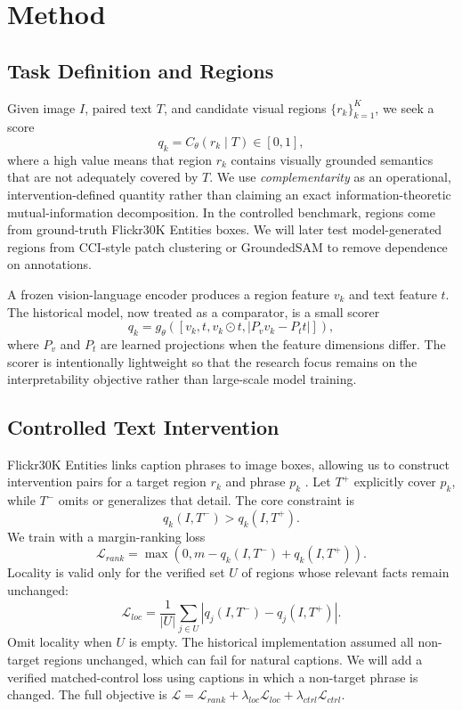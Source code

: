 \documentclass[10pt,twocolumn]{article}
\begin{document}
\section{Method}
\subsection{Task Definition and Regions}
Given image $I$, paired text $T$, and candidate visual regions $\{r_k\}_{k=1}^{K}$, we seek a score
\begin{equation}
q_k = C_\theta(r_k\mid T) \in [0,1],
\end{equation}
where a high value means that region $r_k$ contains visually grounded semantics that are not adequately covered by $T$. We use \emph{complementarity} as an operational, intervention-defined quantity rather than claiming an exact information-theoretic mutual-information decomposition. In the controlled benchmark, regions come from ground-truth Flickr30K Entities boxes. We will later test model-generated regions from CCI-style patch clustering or GroundedSAM to remove dependence on annotations.

A frozen vision-language encoder produces a region feature $v_k$ and text feature $t$. The historical model, now treated as a comparator, is a small scorer
\begin{equation}
q_k = g_\theta([v_k,t,v_k\odot t,|P_vv_k-P_tt|]),
\end{equation}
where $P_v$ and $P_t$ are learned projections when the feature dimensions differ. The scorer is intentionally lightweight so that the research focus remains on the interpretability objective rather than large-scale model training.

\subsection{Controlled Text Intervention}
Flickr30K Entities links caption phrases to image boxes, allowing us to construct intervention pairs for a target region $r_k$ and phrase $p_k$ \cite{plummer2017}. Let $T^{+}$ explicitly cover $p_k$, while $T^{-}$ omits or generalizes that detail. The core constraint is
\begin{equation}
q_k(I,T^{-}) > q_k(I,T^{+}).
\end{equation}
We train with a margin-ranking loss
\begin{equation}
\mathcal L_{rank}=\max(0,m-q_k(I,T^{-})+q_k(I,T^{+})).
\end{equation}
Locality is valid only for the verified set $U$ of regions whose relevant facts remain unchanged:
\begin{equation}
\mathcal L_{loc}=\frac{1}{|U|}\sum_{j\in U}|q_j(I,T^{-})-q_j(I,T^{+})|.
\end{equation}
Omit locality when $U$ is empty. The historical implementation assumed all non-target regions unchanged, which can fail for natural captions. We will add a verified matched-control loss using captions in which a non-target phrase is changed. The full objective is $\mathcal L=\mathcal L_{rank}+\lambda_{loc}\mathcal L_{loc}+\lambda_{ctrl}\mathcal L_{ctrl}$.
\end{document}
